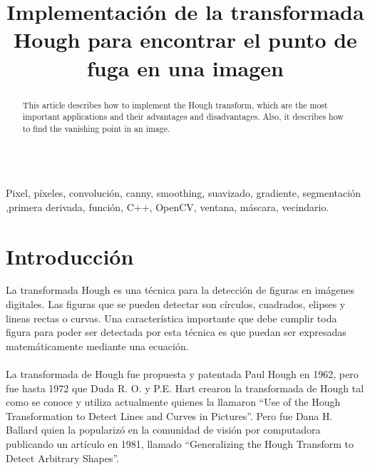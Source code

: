 \documentclass[conference]{IEEEtran}
\begin{document}
\title{ Implementaci\'on de la transformada Hough para encontrar el punto de fuga en una imagen }
\author{
}

\maketitle
\renewcommand\abstractname{Abstract}
\begin{abstract}
This article describes how to implement the Hough transform, which are the most important applications and their advantages and disadvantages. Also, it describes how to find the vanishing point in an image. \\\\
\end{abstract}

\begin{IEEEkeywords}
Pixel, p\'ixeles, convoluci\'on, canny, smoothing, suavizado, gradiente, segmentaci\'on ,primera derivada, funci\'on, C++, OpenCV, ventana, m\'ascara, vecindario.
\end{IEEEkeywords}

\IEEEpeerreviewmaketitle
\section{Introducci\'on}
La transformada Hough es una t\'ecnica para la detecci\'on de figuras en im\'agenes digitales. Las figuras que se pueden detectar son c\'irculos, cuadrados, elipses y lineas rectas o curvas. Una caracter\'istica importante que debe cumplir toda figura para poder ser detectada por esta t\'ecnica es que puedan ser expresadas matem\'aticamente mediante una ecuaci\'on. \\\\
La transformada de Hough fue propuesta y patentada Paul Hough en 1962, pero fue hasta 1972 que Duda R. O. y P.E. Hart crearon la transformada de Hough tal como se conoce y utiliza actualmente quienes la llamaron ``Use of the Hough Transformation to Detect Lines and Curves in Pictures''. Pero fue Dana H. Ballard quien la populariz\'o en la comunidad de visi\'on por computadora publicando un art\'iculo en 1981, llamado ``Generalizing the Hough Transform to Detect Arbitrary Shapes''.\\
\end{document}
